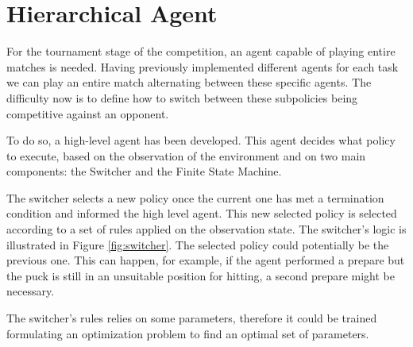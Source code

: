 \section{Hierarchical Agent}
\label{sec:hierarchical_agent}
For the tournament stage of the competition, an agent capable of playing entire matches is needed.
Having previously implemented different agents for each task we can play an entire match alternating between these specific agents.
The difficulty now is to define how to switch between these subpolicies being competitive against an opponent.

To do so, a high-level agent has been developed. 
This agent decides what policy to execute, based on the observation of the environment and on two main components: the Switcher and the Finite State Machine.

The switcher selects a new policy once the current one has met a termination condition and informed the high level agent.
This new selected policy is selected according to a set of rules applied on the observation state. The switcher's logic is illustrated in Figure \ref{fig:switcher}.
The selected policy could potentially be the previous one. This can happen, for example, if the agent performed a prepare but the
puck is still in an unsuitable position for hitting, a second prepare might be necessary.

The switcher's rules relies on some parameters, therefore it could be trained formulating an optimization problem to find an optimal set of parameters.



